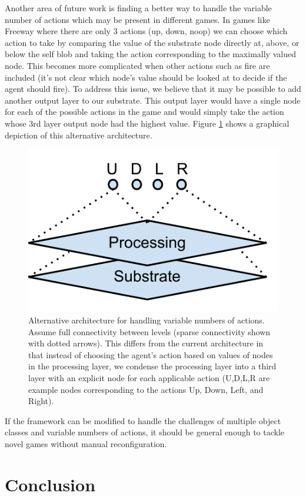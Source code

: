 \documentclass{article}
\begin{document}
Another area of future work is finding a better way to handle the variable number of actions which may be present in different games. In games like Freeway where there are only 3 actions (up, down, noop) we can choose which action to take by comparing the value of the substrate node directly at, above, or below the self blob and taking the action corresponding to the maximally valued node. This becomes more complicated when other actions such as fire are included (it's not clear which node's value should be looked at to decide if the agent should fire). To address this issue, we believe that it may be possible to add another output layer to our substrate. This output layer would have a single node for each of the possible actions in the game and would simply take the action whose 3rd layer output node had the highest value. Figure \ref{fig:possiblearch} shows a graphical depiction of this alternative architecture.

\begin{figure}[htp]
\begin{center}
\includegraphics[scale=1]{figures/possiblearch}
\end{center}
\caption{Alternative architecture for handling variable numbers of actions. Assume full connectivity between levels (sparse connectivity shown with dotted arrows). This differs from the current architecture in that instead of choosing the agent's action based on values of nodes in the processing layer, we condense the processing layer into a third layer with an explicit node for each applicable action (U,D,L,R are example nodes corresponding to the actions Up, Down, Left, and Right).}
\label{fig:possiblearch}
\end{figure}

If the framework can be modified to handle the challenges of multiple object classes and variable numbers of actions, it should be general enough to tackle novel games without manual reconfiguration.

\section{Conclusion}


	

\end{document}
